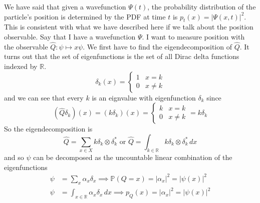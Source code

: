 \documentclass{article}
\begin{document}
  \begin{example}
    \label{ex:measurement-of-the-position-observable}
    We have said that given a wavefunction $\Psi (t)$, the probability distribution of the particle's position is determined by the PDF at time $t$ is $p_t (x) = |\Psi(x, t)|^2$. This is consistent with what we have described here if we talk about the position observable. Say that I have a wavefunction $\Psi$. I want to measure position with the observable $\hat{Q} : \psi \mapsto x \psi$. We first have to find the eigendecomposition of $\hat{Q}$. It turns out that the set of eigenfunctions is the set of all Dirac delta functions indexed by $\mathbb{R}$. 
    \begin{equation} 
      \delta_k (x) = \begin{cases} 1 & x = k \\ 0 & x \neq k \end{cases} 
    \end{equation}
    and we can see that every $k$ is an eignvalue with eigenfunction $\delta_k$ since 
    \begin{equation} 
      (\hat{Q} \delta_k)(x) = (k \delta_k) (x) = \begin{cases} k & x = k \\ 0 & x \neq k \end{cases} = k \delta_k 
    \end{equation}
    So the eigendecomposition is 
    \begin{equation} 
      \hat{Q} = \sum_{x \in X} k \delta_k \otimes \delta_k^\ast \text{ or } \hat{Q} = \int_{k \in \mathbb{R}} k \delta_k \otimes \delta_k^\ast \,dx 
    \end{equation}
    and so $\psi$ can be decomposed as the uncountable linear combination of the eigenfunctions 
    \begin{align*} 
      \psi & = \sum_x \alpha_x \delta_x \implies \mathbb{P}(Q = x) = |\alpha_x|^2  = | \psi(x) |^2\\  
      \psi & = \int_{x \in \mathbb{R}} \alpha_x \delta_x \,dx \implies p_Q (x) = |\alpha_x|^2 = |\psi(x)|^2 
    \end{align*}
  \end{example}   
\end{document}
